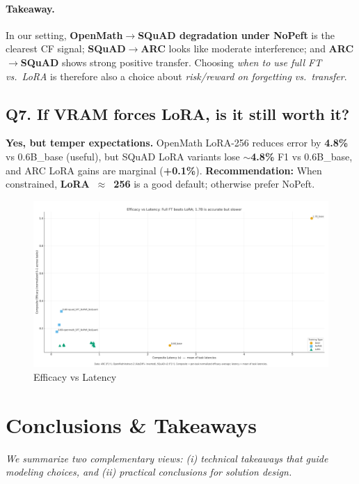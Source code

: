 \documentclass[11pt,a4paper]{article}
\begin{document}
\paragraph{Takeaway.}
In our setting, \textbf{OpenMath$\rightarrow$SQuAD degradation under NoPeft} is the clearest CF signal; \textbf{SQuAD$\rightarrow$ARC} looks like moderate interference; and \textbf{ARC$\rightarrow$SQuAD} shows strong positive transfer. Choosing \emph{when to use full FT vs.\ LoRA} is therefore also a choice about \emph{risk/reward on forgetting vs.\ transfer}.

\subsection*{Q7. If VRAM forces LoRA, is it still worth it?}
\textbf{Yes, but temper expectations.} 
OpenMath LoRA-256 reduces error by \textbf{4.8\%} vs 0.6B\_base (useful), but SQuAD LoRA variants lose \textbf{$\sim$4.8\%} F1 vs 0.6B\_base, and ARC LoRA gains are marginal (\textbf{+0.1\%}). 
\textbf{Recommendation:} When constrained, \textbf{LoRA~$\approx$~256} is a good default; otherwise prefer NoPeft.

\begin{figure}[H]
    \centering
    \includegraphics[width=1\linewidth]{01_Finetuning_ModelSize_LoraR.png}
    \caption{Efficacy vs Latency}
    \label{fig:placeholder}
\end{figure}

\section{Conclusions \& Takeaways}
\textit{We summarize two complementary views: (i) technical takeaways that guide modeling choices, and (ii) practical conclusions for solution design.}
\end{document}
